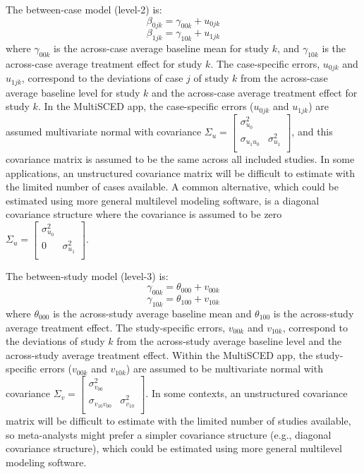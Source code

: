 \documentclass[
]{book}
\begin{document}
The between-case model (level-2) is:
\begin{equation}
\label{eq:MLM-L2-Int-NoTrend}
\beta_{0jk} = \gamma_{00k} + u_{0jk}
\end{equation}
\begin{equation}
\label{eq:MLM-L2-slope-NoTrend}
\beta_{1jk} = \gamma_{10k} + u_{1jk}
\end{equation}
where \(\gamma_{00k}\) is the across-case average baseline mean for study \(k\), and \(\gamma_{10k}\) is the across-case average treatment effect for study \(k\). The case-specific errors, \(u_{0jk}\) and \(u_{1jk}\), correspond to the deviations of case \(j\) of study \(k\) from the across-case average baseline level for study \(k\) and the across-case average treatment effect for study \(k\). In the MultiSCED app, the case-specific errors (\(u_{0jk}\) and \(u_{1jk}\)) are assumed multivariate normal with covariance
\(\Sigma_u = \begin{bmatrix} \sigma_{u_0}^2 & \\ \sigma_{u_1u_0} & \sigma_{u_1}^2 \\ \end{bmatrix}\),
and this covariance matrix is assumed to be the same across all included studies. In some applications, an unstructured covariance matrix will be difficult to estimate with the limited number of cases available. A common alternative, which could be estimated using more general multilevel modeling software, is a diagonal covariance structure where the covariance is assumed to be zero
\(\Sigma_u = \begin{bmatrix} \sigma_{u_0}^2 & \\ 0 & \sigma_{u_1}^2 \\ \end{bmatrix}\).

The between-study model (level-3) is:
\begin{equation}
\label{eq:MLM-L3-Int-NoTrend}
\gamma_{00k} = \theta_{000} + v_{00k}
\end{equation}
\begin{equation}
\label{eq:MLM-L3-slope-NoTrend}
\gamma_{10k} = \theta_{100} + v_{10k}
\end{equation}
where \(\theta_{000}\) is the across-study average baseline mean and \(\theta_{100}\) is the across-study average treatment effect. The study-specific errors, \(v_{00k}\) and \(v_{10k}\), correspond to the deviations of study \(k\) from the across-study average baseline level and the across-study average treatment effect. Within the MultiSCED app, the study-specific errors (\(v_{00k}\) and \(v_{10k}\)) are assumed to be multivariate normal with covariance
\(\Sigma_v = \begin{bmatrix} \sigma_{v_{00}}^2 & \\ \sigma_{v_{10}v_{00}} & \sigma_{v_{10}}^2 \\ \end{bmatrix}\).
In some contexts, an unstructured covariance matrix will be difficult to estimate with the limited number of studies available, so meta-analysts might prefer a simpler covariance structure (e.g., diagonal covariance structure), which could be estimated using more general multilevel modeling software.
\end{document}

